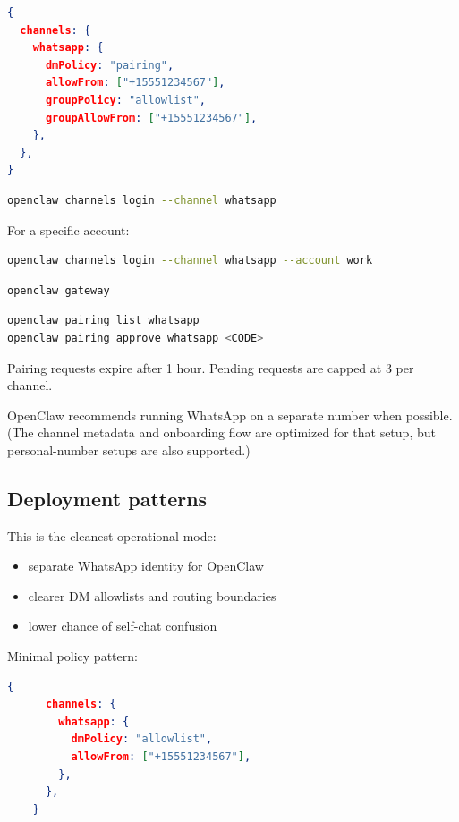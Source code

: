 \begin{lstlisting}[language=json]
{
  channels: {
    whatsapp: {
      dmPolicy: "pairing",
      allowFrom: ["+15551234567"],
      groupPolicy: "allowlist",
      groupAllowFrom: ["+15551234567"],
    },
  },
}
\end{lstlisting}




\begin{lstlisting}[language=bash]
openclaw channels login --channel whatsapp
\end{lstlisting}


For a specific account:

\begin{lstlisting}[language=bash]
openclaw channels login --channel whatsapp --account work
\end{lstlisting}




\begin{lstlisting}[language=bash]
openclaw gateway
\end{lstlisting}




\begin{lstlisting}[language=bash]
openclaw pairing list whatsapp
openclaw pairing approve whatsapp <CODE>
\end{lstlisting}


Pairing requests expire after 1 hour. Pending requests are capped at 3 per channel.


OpenClaw recommends running WhatsApp on a separate number when possible. (The channel metadata and onboarding flow are optimized for that setup, but personal-number setups are also supported.)

\subsection{Deployment patterns}


This is the cleanest operational mode:

\begin{itemize}
  \item separate WhatsApp identity for OpenClaw
  \item clearer DM allowlists and routing boundaries
  \item lower chance of self-chat confusion
\end{itemize}


Minimal policy pattern:

\begin{lstlisting}[language=json]
    {
      channels: {
        whatsapp: {
          dmPolicy: "allowlist",
          allowFrom: ["+15551234567"],
        },
      },
    }
\end{lstlisting}



